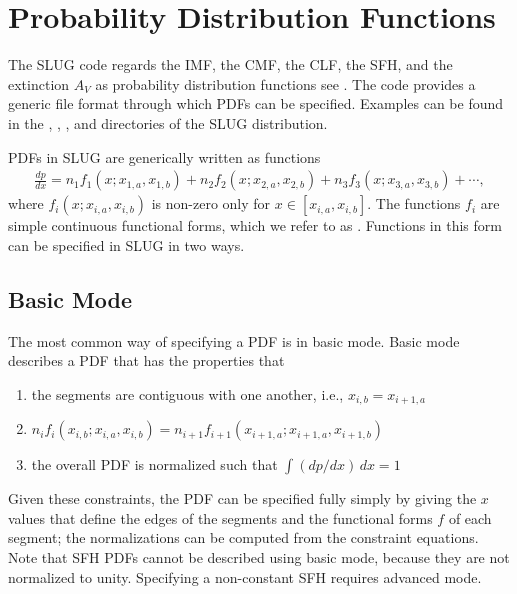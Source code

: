\documentclass[letterpaper,10pt,english]{sphinxmanual}
\begin{document}
\chapter{Probability Distribution Functions}
\label{\detokenize{pdfs:probability-distribution-functions}}\label{\detokenize{pdfs:sec-pdfs}}\label{\detokenize{pdfs::doc}}
The SLUG code regards the IMF, the CMF, the CLF, the SFH, and the extinction \(A_V\) as probability distribution functions \textendash{} see {\hyperref[\detokenize{intro:ssec-slugpdfs}]{}}. The code provides a generic file format through which PDFs can be specified. Examples can be found in the , , , and  directories of the SLUG distribution.

PDFs in SLUG are generically written as functions
\begin{equation*}
\begin{split}\frac{dp}{dx} = n_1 f_1(x; x_{1,a}, x_{1,b}) + n_2 f_2(x; x_{2,a}, x_{2,b}) + n_3 f_3(x; x_{3,a}, x_{3,b}) + \cdots,\end{split}
\end{equation*}
where \(f_i(x; x_{i,a}, x_{i,b})\) is non-zero only for \(x \in [x_{i,a}, x_{i,b}]\). The functions \(f_i\) are simple continuous functional forms, which we refer to as . Functions in this form can be specified in SLUG in two ways.


\section{Basic Mode}
\label{\detokenize{pdfs:basic-mode}}
The most common way of specifying a PDF is in basic mode. Basic mode describes a PDF that has the properties that
\begin{enumerate}
\item {} 
the segments are contiguous with one another, i.e., \(x_{i,b} = x_{i+1,a}\)

\item {} 
\(n_i f_i(x_{i,b}; x_{i,a}, x_{i,b}) = n_{i+1} f_{i+1}(x_{i+1,a}; x_{i+1,a}, x_{i+1,b})\)

\item {} 
the overall PDF is normalized such that \(\int (dp/dx)\, dx = 1\)

\end{enumerate}

Given these constraints, the PDF can be specified fully simply by giving the \(x\) values that define the edges of the segments and the functional forms \(f\) of each segment; the normalizations can be computed from the constraint equations. Note that SFH PDFs cannot be described using basic mode, because they are not normalized to unity. Specifying a non-constant SFH requires advanced mode.
\end{document}
